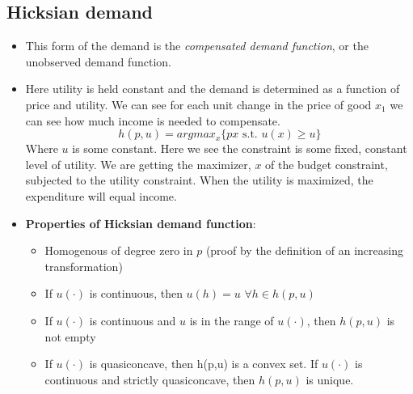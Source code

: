 \documentclass{article}
\begin{document}
\subsection{Hicksian demand}
    \begin{itemize}
        \item This form of the demand is the \textit{compensated demand function}, or the unobserved demand function.
        \item Here utility is held constant and the demand is determined as a function of price and utility. We can see for each unit change in the price of good $x_1$ we can see how much income is needed to compensate. 
        \[
        h(p,u) = arg max_x\{px \text{ s.t. } u(x) \geq u\}
        \]
        Where $u$ is some constant. Here we see the constraint is some fixed, constant level of utility. We are getting the maximizer, $x$ of the budget constraint, subjected to the utility constraint. When the utility is maximized, the expenditure will equal income. 
        \item \textbf{Properties of Hicksian demand function}:
        \begin{itemize}
            \item Homogenous of degree zero in $p$ (proof by the definition of an increasing transformation)
            \item If $u(\cdot)$ is continuous, then $u(h) = u$    $\forall h \in h(p,u)$
            \item If $u(\cdot)$ is continuous and $u$ is in the range of $u(\cdot)$, then $h(p,u)$ is not empty 
            \item If $u(\cdot)$ is quasiconcave, then h(p,u) is a convex set. If $u(\cdot)$ is continuous and strictly quasiconcave, then $h(p,u)$ is unique. 
        \end{itemize}
    \end{itemize}
\end{document}

